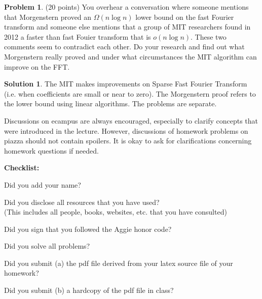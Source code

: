 \documentclass{article}
\theoremstyle{definition}
\newtheorem{problem}{Problem}
\newtheorem*{solution}{Solution}
\newcommand{\checklist}{\noindent\textbf{Checklist:}
\begin{compactitem}[$\Box$] 
\item Did you add your name? 
\item Did you disclose all resources that you have used? \\
(This includes all people, books, websites, etc. that you have consulted)
\item Did you sign that you followed the Aggie honor code? 
\item Did you solve all problems? 
\item Did you submit (a) the pdf file derived from your latex source file
  of your homework?
\item Did you submit (b) a hardcopy of the pdf file in class? 
\end{compactitem}
}
\begin{document}
\begin{problem} (20 points) You overhear a conversation where someone
  mentions that Morgenstern proved an $\Omega(n\log n)$ lower bound on
  the fast Fourier transform and someone else mentions that a group of
  MIT researchers found in 2012 a faster than fast Fouier transform
  that is $o(n\log n)$. These two comments seem to contradict each
  other. Do your research and find out what Morgenstern really proved
  and under what circumstances the MIT algorithm can improve on the
  FFT.
\end{problem}
\begin{solution}
The MIT makes improvements on Sparse Fast Fourier Transform (i.e. when coefficients are small or near to zero). The Morgenstern proof refers to the lower bound using linear algorithms. The problems are separate.
\end{solution}

Discussions on ecampus are always encouraged, especially to clarify
concepts that were introduced in the lecture. However, discussions of
homework problems on piazza should not contain spoilers. It is okay to
ask for clarifications concerning homework questions if needed. 
\medskip



\goodbreak
\checklist
\end{document}
